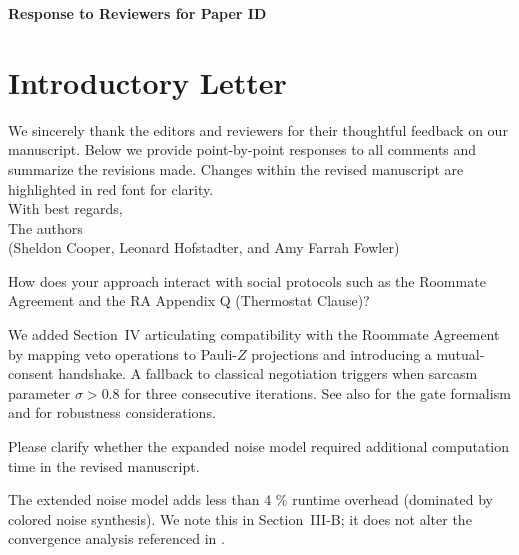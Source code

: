 \documentclass[a4paper,11pt]{article}
\begin{document}
\pagestyle{fancy}

\begin{center}
    {\Large \textbf{Response to Reviewers for Paper ID \printpaperid}}
\end{center}

\begin{center}
    {\large \textit{\printpapertitle}}
\end{center}

\vspace{1em}

\section*{Introductory Letter}
We sincerely thank the editors and reviewers for their thoughtful feedback on our manuscript. Below we provide point-by-point responses to all comments and summarize the revisions made. Changes within the revised manuscript are highlighted in red font for clarity.\\

\noindent With best regards,\\
The authors \\
{(Sheldon Cooper, Leonard Hofstadter, and Amy Farrah Fowler)}


\begin{question}[q:agreement]
How does your approach interact with social protocols such as the Roommate Agreement and the RA Appendix Q (Thermostat Clause)?
\end{question}
\begin{answer}[a:agreement]
We added Section~IV articulating compatibility with the Roommate Agreement by mapping veto operations to Pauli-$Z$ projections and introducing a mutual-consent handshake. A fallback to classical negotiation triggers when sarcasm parameter $\sigma>0.8$ for three consecutive iterations. See also  for the gate formalism and  for robustness considerations.
\end{answer}


\begin{question}[q:ae-scope]
Please clarify whether the expanded noise model required additional computation time in the revised manuscript.
\end{question}
\begin{answer}[a:ae-scope]
The extended noise model adds less than 4 \% runtime overhead (dominated by colored noise synthesis). We note this in Section~III-B; it does not alter the convergence analysis referenced in .
\end{answer}
\end{document}
